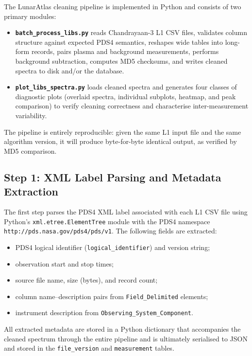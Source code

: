 \documentclass[a4paper,twocolumn,10pt]{article}
\begin{document}
The LunarAtlas cleaning pipeline is implemented in Python and consists
of two primary modules:

\begin{itemize}[nosep,leftmargin=*]
  \item \textbf{\texttt{batch\_process\_libs.py}} reads Chandrayaan-3
    L1 CSV files, validates column structure against expected PDS4
    semantics, reshapes wide tables into long-form records, pairs
    plasma and background measurements, performs background
    subtraction, computes MD5 checksums, and writes cleaned spectra to
    disk and/or the database.

  \item \textbf{\texttt{plot\_libs\_spectra.py}} loads cleaned spectra
    and generates four classes of diagnostic plots (overlaid spectra,
    individual subplots, heatmap, and peak comparison) to verify
    cleaning correctness and characterise inter-measurement variability.
\end{itemize}

The pipeline is entirely reproducible: given the same L1 input file
and the same algorithm version, it will produce byte-for-byte identical
output, as verified by MD5 comparison.

\subsection{Step 1: XML Label Parsing and Metadata Extraction}

The first step parses the PDS4 XML label associated with each L1 CSV
file using Python's \texttt{xml.etree.ElementTree} module with the
PDS4 namespace \texttt{http://pds.nasa.gov/pds4/pds/v1}.  The
following fields are extracted:

\begin{itemize}[nosep,leftmargin=*]
  \item PDS4 logical identifier (\texttt{logical\_identifier}) and
    version string;
  \item observation start and stop times;
  \item source file name, size (bytes), and record count;
  \item column name--description pairs from
    \texttt{Field\_Delimited} elements;
  \item instrument description from
    \texttt{Observing\_System\_Component}.
\end{itemize}

All extracted metadata are stored in a Python dictionary that
accompanies the cleaned spectrum through the entire pipeline and is
ultimately serialised to JSON and stored in the \texttt{file\_version}
and \texttt{measurement} tables.
\end{document}
